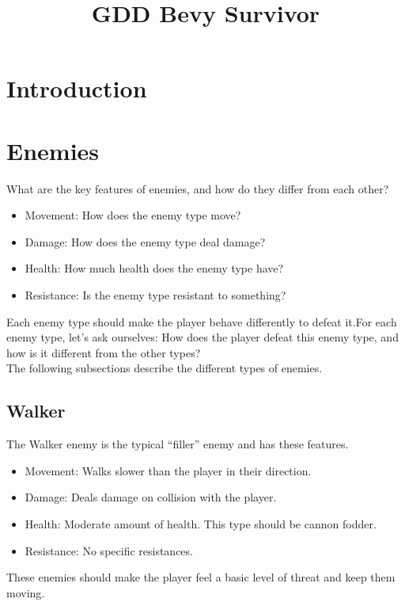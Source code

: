 \documentclass[12pt]{article}
\title{GDD Bevy Survivor}
\begin{document}
\maketitle
\newpage

\tableofcontents
\section{Introduction}


\newpage
\section{Enemies}
What are the key features of enemies, and how do they differ from each other?
\begin{itemize}
    \item Movement: How does the enemy type move?
    \item Damage: How does the enemy type deal damage?
    \item Health: How much health does the enemy type have?
    \item Resistance: Is the enemy type resistant to something?
\end{itemize}
Each enemy type should make the player behave differently to defeat it.For each enemy type, let's ask ourselves: 
How does the player defeat this enemy type, and how is it different from the other types?\\

\noindent
The following subsections describe the different types of enemies.

\subsection{Walker}
The Walker enemy is the typical “filler” enemy and has these features.
\begin{itemize}
    \item Movement: Walks slower than the player in their direction. 
    \item Damage: Deals damage on collision with the player. 
    \item Health: Moderate amount of health. This type should be cannon fodder. 
    \item Resistance: No specific resistances.
\end{itemize}
These enemies should make the player feel a basic level of threat and keep them moving.
\end{document}
